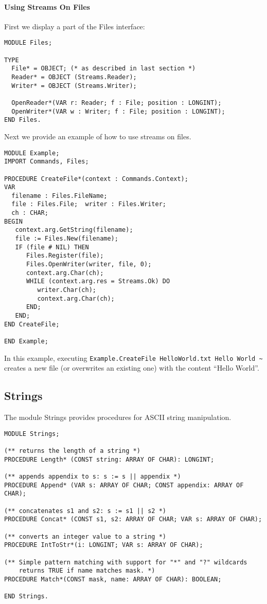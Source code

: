 \documentclass[a4paper,11pt]{article}
\begin{document}
\paragraph{Using Streams On Files}

First we display a part of the Files interface:
\begin{lstlisting}[language=Oberon,frame=none,caption={Using Streams On Files}]
MODULE Files;

TYPE
  File* = OBJECT; (* as described in last section *)
  Reader* = OBJECT (Streams.Reader);
  Writer* = OBJECT (Streams.Writer);

  OpenReader*(VAR r: Reader; f : File; position : LONGINT);
  OpenWriter*(VAR w : Writer; f : File; position : LONGINT);
END Files.
\end{lstlisting}

Next we provide an example of how to use streams on files.
\begin{lstlisting}[language=Oberon,frame=none,caption={Example: Create A New File}]
MODULE Example;
IMPORT Commands, Files;

PROCEDURE CreateFile*(context : Commands.Context);
VAR
  filename : Files.FileName;
  file : Files.File;  writer : Files.Writer;
  ch : CHAR;
BEGIN
   context.arg.GetString(filename);
   file := Files.New(filename);
   IF (file # NIL) THEN
      Files.Register(file);
      Files.OpenWriter(writer, file, 0);
      context.arg.Char(ch);
      WHILE (context.arg.res = Streams.Ok) DO
         writer.Char(ch);
         context.arg.Char(ch);
      END;
   END;
END CreateFile;

END Example;
\end{lstlisting}

In this example, executing \verb+Example.CreateFile HelloWorld.txt Hello World ~+ creates a new file (or overwrites an existing one) with the content ``Hello World''.

\subsection{Strings}
The module Strings provides procedures for ASCII string manipulation.

\begin{lstlisting}[language=Oberon,frame=none,caption={Strings}]
MODULE Strings;

(** returns the length of a string *)
PROCEDURE Length* (CONST string: ARRAY OF CHAR): LONGINT;

(** appends appendix to s: s := s || appendix *)
PROCEDURE Append* (VAR s: ARRAY OF CHAR; CONST appendix: ARRAY OF CHAR);

(** concatenates s1 and s2: s := s1 || s2 *)
PROCEDURE Concat* (CONST s1, s2: ARRAY OF CHAR; VAR s: ARRAY OF CHAR);

(** converts an integer value to a string *)
PROCEDURE IntToStr*(i: LONGINT; VAR s: ARRAY OF CHAR);

(** Simple pattern matching with support for "*" and "?" wildcards
    returns TRUE if name matches mask. *)
PROCEDURE Match*(CONST mask, name: ARRAY OF CHAR): BOOLEAN;

END Strings.
\end{lstlisting}
\end{document}
